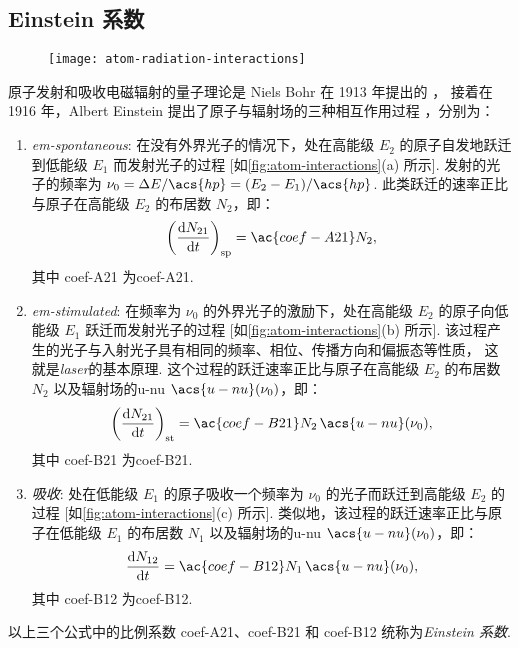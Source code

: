 \subsection{Einstein 系数}

\begin{figure}[htp]
  \centering
  \texttt{[image: atom-radiation-interactions]}
  \label{fig:atom-interactions}
\end{figure}

原子发射和吸收电磁辐射的量子理论是 Niels Bohr 在 1913 年提出的 \cite{bohr1913}，
接着在 1916 年，Albert Einstein 提出了原子与辐射场的三种相互作用过程
\cite{einstein1916}，分别为：
\begin{enumerate}
\item \emph{\acf{em-spontaneous}}:
  在没有外界光子的情况下，处在高能级 $E_2$ 的原子自发地跃迁到低能级 $E_1$
  而发射光子的过程 [如\autoref{fig:atom-interactions}(a) 所示].
  发射的光子的频率为 $\nu_0 = \Delta E / \acs{hp} = (E_2 - E_1) / \acs{hp}$.
  此类跃迁的速率正比与原子在高能级 $E_2$ 的布居数 $N_2$，即：
  \begin{equation}
    \label{eq:rate-em-spontaneous}
    \left( \diff{N_{21}}{t} \right)_{\R{sp}} = \ac{coef-A21} N_2 ,
  \end{equation}
  其中 \ac{coef-A21} 为\acl{coef-A21}.

\item \emph{\acf{em-stimulated}}:
  在频率为 $\nu_0$ 的外界光子的激励下，处在高能级 $E_2$ 的原子向低能级 $E_1$
  跃迁而发射光子的过程 [如\autoref{fig:atom-interactions}(b) 所示].
  该过程产生的光子与入射光子具有相同的频率、相位、传播方向和偏振态等性质，
  这就是\emph{\acf{laser}}的基本原理.
  这个过程的跃迁速率正比与原子在高能级 $E_2$ 的布居数 $N_2$
  以及辐射场的\acl{u-nu} $\acs{u-nu}(\nu_0)$，即：
  \begin{equation}
    \label{eq:rate-em-stimulated}
    \left( \diff{N_{21}}{t} \right)_{\R{st}}
      = \ac{coef-B21} N_2 \, \acs{u-nu}(\nu_0) ,
  \end{equation}
  其中 \ac{coef-B21} 为\acl{coef-B21}.

\item \emph{吸收}:
  处在低能级 $E_1$ 的原子吸收一个频率为 $\nu_0$ 的光子而跃迁到高能级 $E_2$ 的过程
  [如\autoref{fig:atom-interactions}(c) 所示].
  类似地，该过程的跃迁速率正比与原子在低能级 $E_1$ 的布居数 $N_1$
  以及辐射场的\acl{u-nu} $\acs{u-nu}(\nu_0)$，即：
  \begin{equation}
    \label{eq:rate-absorption}
    \diff{N_{12}}{t} = \ac{coef-B12} N_1 \, \acs{u-nu}(\nu_0) ,
  \end{equation}
  其中 \ac{coef-B12} 为\acl{coef-B12}.
\end{enumerate}
以上三个公式中的比例系数 \ac{coef-A21}、\ac{coef-B21} 和 \ac{coef-B12}
统称为\emph{Einstein 系数}.


